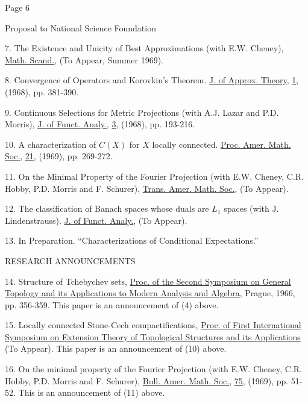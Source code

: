 Page 6

Proposal to National Science Foundation

7. The Existence and Unicity of Best Approximations (with E.W. Cheney), \uline{Math. Scand.}, (To Appear, Summer 1969).

8. Convergence of Operators and Korovkin's Theorem. \uline{J. of Approx. Theory}, \uline{1}, (1968), pp. 381-390.

9. Continuous Selections for Metric Projections (with A.J. Lazar and P.D. Morris), \uline{J. of Funct. Analy.}, \uline{3}, (1968), pp. 193-216.

10. A characterization of $C(X)$ for $X$ locally connected. \uline{Proc. Amer. Math. Soc.}, \uline{21}, (1969), pp. 269-272.

11. On the Minimal Property of the Fourier Projection (with E.W. Cheney, C.R. Hobby, P.D. Morris and F. Schurer), \uline{Trans. Amer. Math. Soc.}, (To Appear).

12. The classification of Banach spaces whose duals are $L_1$ spaces (with J. Lindenstrauss). \uline{J. of Funct. Analy.}, (To Appear).

13. In Preparation. ``Characterizations of Conditional Expectations.''

RESEARCH ANNOUNCEMENTS

14. Structure of Tchebychev sets, \uline{Proc. of the Second Symposium on General Topology and its Applications to Modern Analysis and Algebra}, Prague, 1966, pp. 356-359. This paper is an announcement of (4) above.

15. Locally connected Stone-Cech compactifications, \uline{Proc. of First International Symposium on Extension Theory of Topological Structures and its Applications} (To Appear). This paper is an announcement of (10) above.

16. On the minimal property of the Fourier Projection (with E.W. Cheney, C.R. Hobby, P.D. Morris and F. Schurer), \uline{Bull. Amer. Math. Soc.}, \uline{75}, (1969), pp. 51-52. This is an announcement of (11) above.
